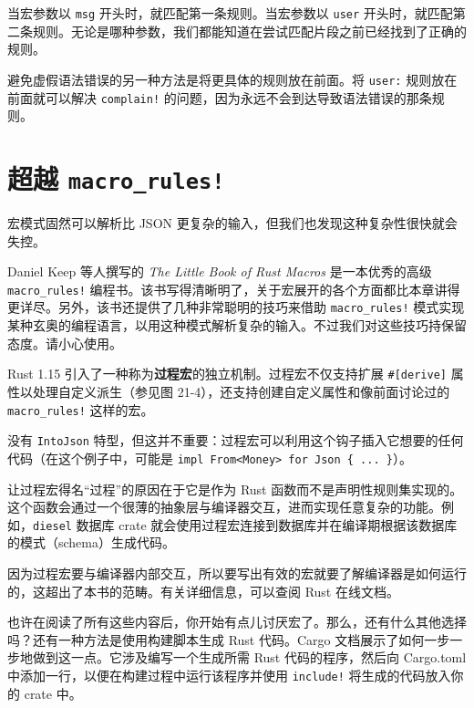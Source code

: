当宏参数以 \texttt{msg} 开头时，就匹配第一条规则。当宏参数以 \texttt{user} 开头时，就匹配第二条规则。无论是哪种参数，我们都能知道在尝试匹配片段之前已经找到了正确的规则。

避免虚假语法错误的另一种方法是将更具体的规则放在前面。将 \texttt{user:} 规则放在前面就可以解决 \texttt{complain!} 的问题，因为永远不会到达导致语法错误的那条规则。

\section{超越 \texttt{macro\_rules!}}

宏模式固然可以解析比 JSON 更复杂的输入，但我们也发现这种复杂性很快就会失控。

Daniel Keep 等人撰写的 \emph{The Little Book of Rust Macros} 是一本优秀的高级 \texttt{macro\_rules!} 编程书。该书写得清晰明了，关于宏展开的各个方面都比本章讲得更详尽。另外，该书还提供了几种非常聪明的技巧来借助 \texttt{macro\_rules!} 模式实现某种玄奥的编程语言，以用这种模式解析复杂的输入。不过我们对这些技巧持保留态度。请小心使用。

Rust 1.15 引入了一种称为\textbf{过程宏}的独立机制。过程宏不仅支持扩展 \texttt{\#[derive]} 属性以处理自定义派生（参见图 21-4），还支持创建自定义属性和像前面讨论过的 \texttt{macro\_rules!} 这样的宏。


没有 \texttt{IntoJson} 特型，但这并不重要：过程宏可以利用这个钩子插入它想要的任何代码（在这个例子中，可能是 \texttt{impl From<Money> for Json \{ ... \}}）。

让过程宏得名“过程”的原因在于它是作为 Rust 函数而不是声明性规则集实现的。这个函数会通过一个很薄的抽象层与编译器交互，进而实现任意复杂的功能。例如，\texttt{diesel} 数据库 crate 就会使用过程宏连接到数据库并在编译期根据该数据库的模式（schema）生成代码。

因为过程宏要与编译器内部交互，所以要写出有效的宏就要了解编译器是如何运行的，这超出了本书的范畴。有关详细信息，可以查阅 Rust 在线文档。

也许在阅读了所有这些内容后，你开始有点儿讨厌宏了。那么，还有什么其他选择吗？还有一种方法是使用构建脚本生成 Rust 代码。Cargo 文档展示了如何一步一步地做到这一点。它涉及编写一个生成所需 Rust 代码的程序，然后向 Cargo.toml 中添加一行，以便在构建过程中运行该程序并使用 \texttt{include!} 将生成的代码放入你的 crate 中。

